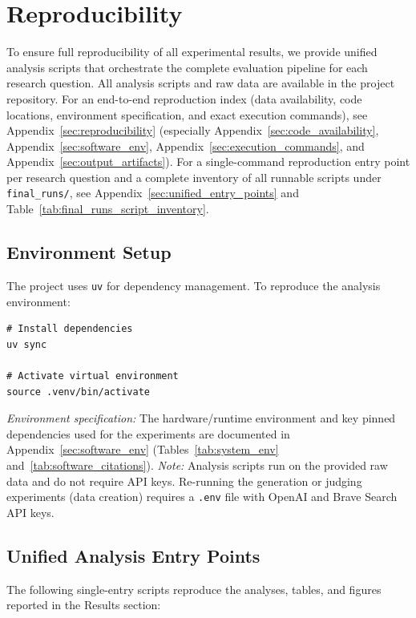 \section{Reproducibility}
\label{sec:reproduction}

To ensure full reproducibility of all experimental results, we provide unified analysis scripts that orchestrate the complete evaluation pipeline for each research question. All analysis scripts and raw data are available in the project repository.
For an end-to-end reproduction index (data availability, code locations, environment specification, and exact execution commands), see Appendix~\ref{sec:reproducibility} (especially Appendix~\ref{sec:code_availability}, Appendix~\ref{sec:software_env}, Appendix~\ref{sec:execution_commands}, and Appendix~\ref{sec:output_artifacts}).
For a single-command reproduction entry point per research question and a complete inventory of all runnable scripts under \texttt{final\_runs/}, see Appendix~\ref{sec:unified_entry_points} and Table~\ref{tab:final_runs_script_inventory}.

\subsection{Environment Setup}
The project uses \texttt{uv} for dependency management. To reproduce the analysis environment:
\begin{verbatim}
# Install dependencies
uv sync

# Activate virtual environment
source .venv/bin/activate
\end{verbatim}
\textit{Environment specification:} The hardware/runtime environment and key pinned dependencies used for the experiments are documented in Appendix~\ref{sec:software_env} (Tables~\ref{tab:system_env} and~\ref{tab:software_citations}).
\textit{Note:} Analysis scripts run on the provided raw data and do not require API keys. Re-running the generation or judging experiments (data creation) requires a \texttt{.env} file with OpenAI and Brave Search API keys.

\subsection{Unified Analysis Entry Points}
The following single-entry scripts reproduce the analyses, tables, and figures reported in the Results section:

